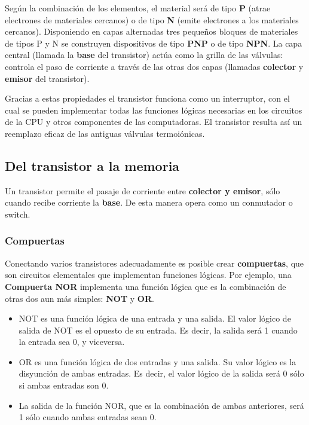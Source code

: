 \documentclass[spanish,A4,]{article}
\begin{document}
Según la combinación de los elementos, el material será de tipo
\textbf{P} (atrae electrones de materiales cercanos) o de tipo
\textbf{N} (emite electrones a los materiales cercanos). Disponiendo en
capas alternadas tres pequeños bloques de materiales de tipos P y N se
construyen dispositivos de tipo \textbf{PNP} o de tipo \textbf{NPN}. La
capa central (llamada la \textbf{base} del transistor) actúa como la
grilla de las válvulas: controla el paso de corriente a través de las
otras dos capas (llamadas \textbf{colector} y \textbf{emisor} del
transistor).

Gracias a estas propiedades el transistor funciona como un interruptor,
con el cual se pueden implementar todas las funciones lógicas necesarias
en los circuitos de la CPU y otros componentes de las computadoras. El
transistor resulta así un reemplazo eficaz de las antiguas válvulas
termoiónicas.

\subsection{Del transistor a la
memoria}\label{del-transistor-a-la-memoria}

Un transistor permite el pasaje de corriente entre \textbf{colector y
emisor}, sólo cuando recibe corriente la \textbf{base}. De esta manera
opera como un conmutador o switch.

\subsubsection{Compuertas}\label{compuertas}

Conectando varios transistores adecuadamente es posible crear
\textbf{compuertas}, que son circuitos elementales que implementan
funciones lógicas. Por ejemplo, una \textbf{Compuerta NOR} implementa
una función lógica que es la combinación de otras dos aun más simples:
\textbf{NOT} y \textbf{OR}.

\begin{itemize}
\itemsep1pt\parskip0pt
\item
  NOT es una función lógica de una entrada y una salida. El valor lógico
  de salida de NOT es el opuesto de su entrada. Es decir, la salida será
  1 cuando la entrada sea 0, y viceversa.
\item
  OR es una función lógica de dos entradas y una salida. Su valor lógico
  es la disyunción de ambas entradas. Es decir, el valor lógico de la
  salida será 0 sólo si ambas entradas son 0.
\item
  La salida de la función NOR, que es la combinación de ambas
  anteriores, será 1 sólo cuando ambas entradas sean 0.
\end{itemize}
\end{document}
